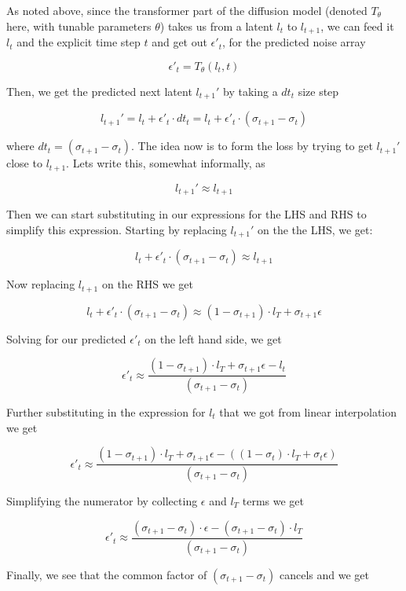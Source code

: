 \documentclass{article}
\begin{document}
As noted above, since the transformer part of the diffusion model (denoted $T_\theta$ here, with tunable parameters $\theta$) takes us from a latent $l_t$ to $l_{t+1}$, we can feed it $l_t$ and the explicit time step $t$ and get out $\epsilon'_t$, for the predicted noise array 

\[
   \epsilon'_t = T_\theta(l_t,t)
\]

Then, we get the predicted next latent $l_{t+1}'$ by taking a $dt_t$ size step


\[
  l_{t+1}' =  l_{t} +  \epsilon'_t \cdot dt_t =  l_{t} +  \epsilon'_t \cdot (\sigma_{t+1} - \sigma_t)
\]

where $dt_t = (\sigma_{t+1} - \sigma_t)$. The idea now is to form the loss by trying to get $l_{t+1}'$ close to $l_{t+1}$. Lets write this, somewhat informally, as  


\[
    \boxed{l_{t+1}' \approx l_{t+1}}
\]

Then we can start substituting in our expressions for the LHS and RHS to simplify this expression. Starting by replacing $l_{t+1}'$ on the the LHS, we get:   


\[
    l_{t} +  \epsilon'_t \cdot (\sigma_{t+1} - \sigma_t) \approx l_{t+1}
\]

Now replacing $l_{t+1}$ on the RHS we get 

\[
    l_{t} +  \epsilon'_t \cdot (\sigma_{t+1} - \sigma_t) \approx (1-\sigma_{t+1}) \cdot l_T + \sigma_{t+1} \epsilon
\]

Solving for our predicted $\epsilon'_t$ on the left hand side, we get 

\[
    \epsilon'_t \approx \dfrac{(1-\sigma_{t+1}) \cdot l_T + \sigma_{t+1} \epsilon - l_{t}}{(\sigma_{t+1} - \sigma_t)}  
\]

Further substituting in the expression for $l_t$ that we got from linear interpolation we get 


\[
    \epsilon'_t \approx \dfrac{(1-\sigma_{t+1}) \cdot l_T + \sigma_{t+1} \epsilon - ((1-\sigma_t) \cdot l_T + \sigma_t \epsilon)}{(\sigma_{t+1} - \sigma_t)}  
\]

Simplifying the numerator by collecting $\epsilon$ and $l_T$ terms we get

\[
    \epsilon'_t \approx \dfrac{
        (\sigma_{t+1}-\sigma_t) \cdot \epsilon 
        -
        (\sigma_{t+1}-\sigma_t) \cdot l_T
        }
    {(\sigma_{t+1} - \sigma_t)}  
\]

Finally, we see that the common factor of $(\sigma_{t+1}-\sigma_t)$ cancels and we get 
\end{document}
